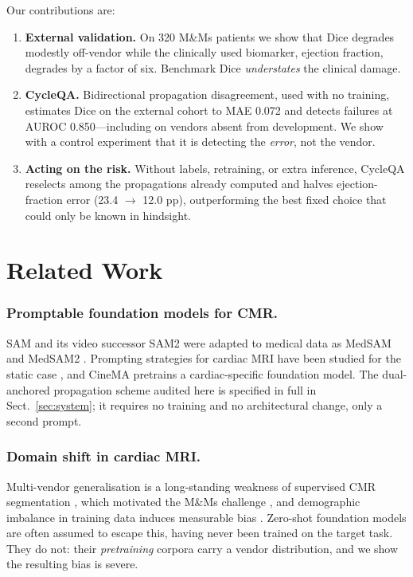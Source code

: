 \documentclass[runningheads]{llncs}
\newcommand{\CQ}{CycleQA}
\begin{document}
Our contributions are:
\begin{enumerate}
\item \textbf{External validation.} On 320 M\&Ms patients we show that Dice degrades
      modestly off-vendor while the clinically used biomarker, ejection fraction,
      degrades by a factor of six. Benchmark Dice \emph{understates} the clinical damage.
\item \textbf{\CQ{}.} Bidirectional propagation disagreement, used with no training,
      estimates Dice on the external cohort to MAE 0.072 and detects failures at AUROC
      0.850---including on vendors absent from development. We show with a control
      experiment that it is detecting the \emph{error}, not the vendor.
\item \textbf{Acting on the risk.} Without labels, retraining, or extra inference, \CQ{}
      reselects among the propagations already computed and halves ejection-fraction
      error (23.4 $\rightarrow$ 12.0 pp), outperforming the best fixed choice that could
      only be known in hindsight.
\end{enumerate}


\section{Related Work}

\subsubsection{Promptable foundation models for CMR.}
SAM \cite{kirillov2023sam} and its video successor SAM2 \cite{ravi2024sam2} were adapted to
medical data as MedSAM \cite{ma2024medsam} and MedSAM2 \cite{zhu2024medsam2}. Prompting
strategies for cardiac MRI have been studied for the static case
\cite{stein2023samcardiac,chen2025cinecmrsam}, and CineMA \cite{fu2025cinema} pretrains a
cardiac-specific foundation model. The dual-anchored propagation scheme audited here
is specified in full in Sect.~\ref{sec:system}; it requires no training and no architectural
change, only a second prompt.

\subsubsection{Domain shift in cardiac MRI.}
Multi-vendor generalisation is a long-standing weakness of supervised CMR segmentation
\cite{tao2019multivendor,chen2020generalizability}, which motivated the M\&Ms challenge
\cite{campello2021mnms,martinisla2023mnm2}, and demographic imbalance in training data
induces measurable bias \cite{puyolanton2021fairness}. Zero-shot foundation models are
often assumed to escape this, having never been trained on the target task. They do not:
their \emph{pretraining} corpora carry a vendor distribution, and we show the resulting
bias is severe.
\end{document}
